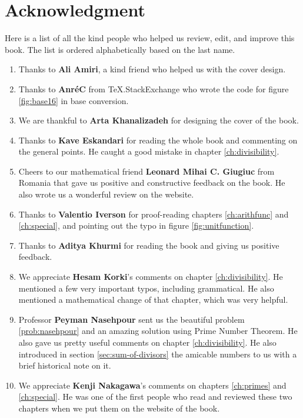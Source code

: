 \documentclass[leqno,12pt]{book}
\begin{document}
\newpage

\section*{Acknowledgment}

Here is a list of all the kind people who helped us review, edit, and improve this book. The list is ordered alphabetically based on the last name.
	\begin{enumerate}
		\item Thanks to \textbf{Ali Amiri}, a kind friend who helped us with the cover design.
		\item Thanks to \textbf{Anr\'{e}C} from TeX.StackExchange who wrote the code for figure \eqref{fig:base16} in base conversion.
		\item We are thankful to \textbf{Arta Khanalizadeh} for designing the cover of the book.
		\item Thanks to \textbf{Kave Eskandari} for reading the whole book and commenting on the general points. He caught a good mistake in chapter \ref{ch:divisibility}.
		\item Cheers to our mathematical friend \textbf{Leonard Mihai C. Giugiuc} from Romania that gave us positive and constructive feedback on the book. He also wrote us a wonderful review on the website.

		\item Thanks to \textbf{Valentio Iverson} for proof-reading chapters \ref{ch:arithfunc} and \ref{ch:special}, and pointing out the typo in figure \eqref{fig:unitfunction}.

		\item Thanks to \textbf{Aditya Khurmi} for reading the book and giving us positive feedback.

		\item We appreciate \textbf{Hesam Korki}'s comments on chapter \ref{ch:divisibility}. He mentioned a few very important typos, including grammatical. He also mentioned a mathematical change of that chapter, which was very helpful.

		\item Professor \textbf{Peyman Nasehpour} sent us the beautiful problem \eqref{prob:nasehpour} and an amazing solution using Prime Number Theorem. He also gave us pretty useful comments on chapter \ref{ch:divisibility}. He also introduced in section \eqref{sec:sum-of-divisors} the amicable numbers to us with a brief historical note on it.

		\item We appreciate \textbf{Kenji Nakagawa}'s comments on chapters \ref{ch:primes} and \ref{ch:special}. He was one of the first people who read and reviewed these two chapters when we put them on the website of the book.


\end{enumerate}
\end{document}
